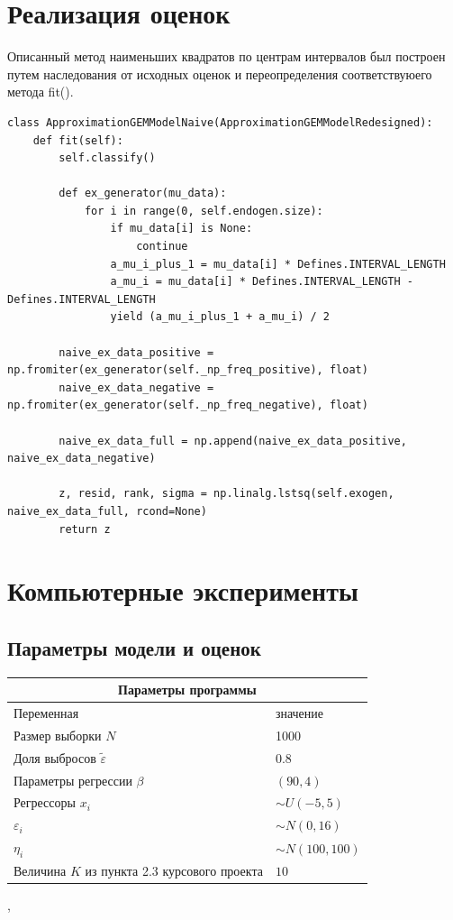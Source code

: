 \newpage
\section{Реализация оценок}
Описанный метод наименьших квадратов по центрам интервалов был построен путем наследования от исходных оценок и переопределения соответствуюего метода fit(). 
\begin{Verbatim}[fontsize=\scriptsize]
class ApproximationGEMModelNaive(ApproximationGEMModelRedesigned):
    def fit(self):
        self.classify()

        def ex_generator(mu_data):
            for i in range(0, self.endogen.size):
                if mu_data[i] is None:
                    continue
                a_mu_i_plus_1 = mu_data[i] * Defines.INTERVAL_LENGTH
                a_mu_i = mu_data[i] * Defines.INTERVAL_LENGTH - Defines.INTERVAL_LENGTH
                yield (a_mu_i_plus_1 + a_mu_i) / 2

        naive_ex_data_positive = np.fromiter(ex_generator(self._np_freq_positive), float)
        naive_ex_data_negative = np.fromiter(ex_generator(self._np_freq_negative), float)

        naive_ex_data_full = np.append(naive_ex_data_positive, naive_ex_data_negative)

        z, resid, rank, sigma = np.linalg.lstsq(self.exogen, naive_ex_data_full, rcond=None)
        return z
\end{Verbatim}

\newpage
\section{Компьютерные эксперименты}
\subsection{Параметры модели и оценок}
\begin{center}
    \begin{tabular}{|p{5cm}|p{5cm}|}
        \hline
        \multicolumn{2}{|c|}{Параметры программы} \\
        \hline
        Переменная&значение\\
        \hline
        Размер выборки $N$& 1000\\
        \hline
        Доля выбросов $\widetilde{\varepsilon}$& 0.8\\
        \hline
        Параметры регрессии $\beta$& $(90,4)$\\
        \hline
        Регрессоры $x_i$ & $\sim U(-5,5)$\\
        \hline
        $\varepsilon_i$&$\sim N(0,16)$\\
        \hline
        $\eta_i$&$\sim N(100,100)$\\
        \hline
        Величина $K$ из пункта 2.3 курсового проекта &$10$\\
        \hline
    \end{tabular},
\end{center}

